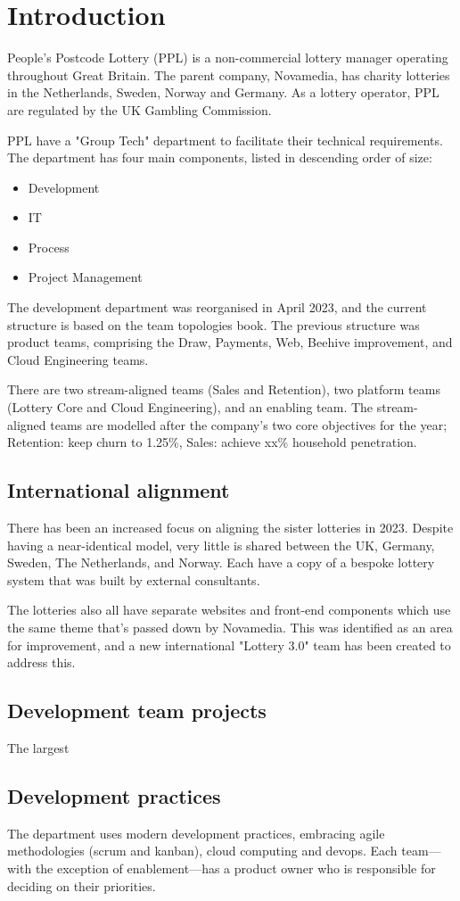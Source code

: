 \section{Introduction}
People's Postcode Lottery (PPL) is a non-commercial lottery manager operating
throughout Great Britain. The parent company, Novamedia, has charity lotteries
in the Netherlands, Sweden, Norway and Germany. As a lottery operator, PPL are
regulated by the UK Gambling Commission.

PPL have a "Group Tech" department to facilitate their technical requirements.
The department has four main components, listed in descending order of size:

\begin{itemize}
  \item{Development}
  \item{IT}
  \item{Process}
  \item{Project Management}
\end{itemize}

The development department was reorganised in April 2023, and the current
structure is based on the team topologies book. The previous structure was
product teams, comprising the Draw, Payments, Web, Beehive improvement, and
Cloud Engineering teams.

There are two stream-aligned teams (Sales and Retention), two platform teams
(Lottery Core and Cloud Engineering), and an enabling team. The stream-aligned
teams are modelled after the company's two core objectives for the year;
Retention: keep churn to 1.25\%, Sales: achieve xx\% household penetration.

\subsection{International alignment}

There has been an increased focus on aligning the sister lotteries in 2023.
Despite having a near-identical model, very little is shared between the UK,
Germany, Sweden, The Netherlands, and Norway. Each have a copy of a bespoke
lottery system that was built by external consultants. %

The lotteries also all have separate websites and front-end components which
use the same theme that's passed down by Novamedia. This was identified as
an area for improvement, and a new international "Lottery 3.0" team has been
created to address this.

\subsection{Development team projects}

The largest 

\subsection{Development practices}

The department uses modern development practices, embracing agile methodologies
(scrum and kanban), cloud computing and devops. Each team---with the exception
of enablement---has a product owner who is responsible for deciding on their
priorities. 
